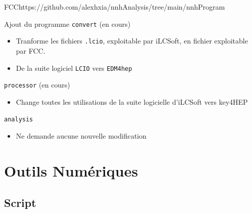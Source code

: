 \documentclass[9pt]{beamer}
\begin{document}
\begin{frame}{FCC}{https://github.com/alexhxia/nnhAnalysis/tree/main/nnhProgram}

	\begin{block}{Ajout du programme \texttt{convert} (en cours)}
		\begin{itemize}
			\item Tranforme les fichiers \texttt{.lcio}, exploitable par iLCSoft, en fichier exploitable par FCC.
			\item De la suite logiciel \texttt{LCIO} vers \texttt{EDM4hep}
		\end{itemize}
	\end{block}

	\begin{block}{\texttt{processor} (en cours)}
		\begin{itemize}
			\item Change toutes les utilisations de la suite logicielle d'iLCSoft vers key4HEP
		\end{itemize}
	\end{block}

	\begin{block}{\texttt{analysis}}
		\begin{itemize}
			\item Ne demande aucune nouvelle modification
		\end{itemize}
	\end{block}

\end{frame}

\section{Outils Numériques}

\subsection{Script}
\end{document}
